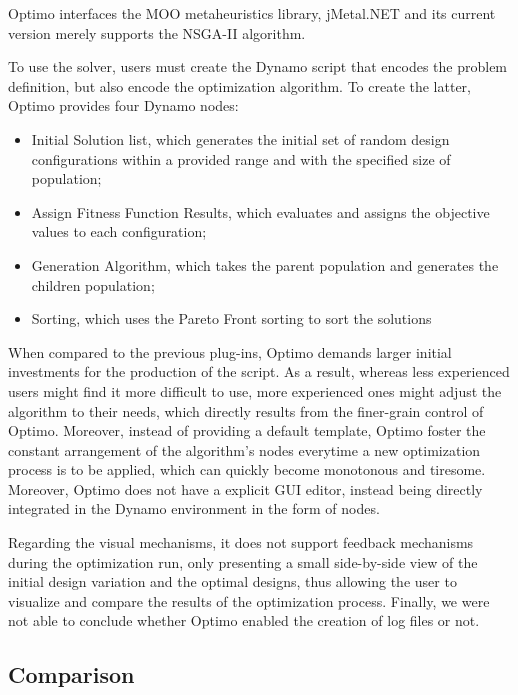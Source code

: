	Optimo interfaces the \ac{MOO} metaheuristics library, jMetal.NET and its current version merely supports the \ac{NSGA-II} algorithm\cite{Deb2002}.
	
	To use the solver, users must create the Dynamo script that encodes the problem definition, but also encode the optimization algorithm. To create the latter, Optimo provides four Dynamo nodes:
	\begin{itemize}
		\item Initial Solution list, which generates the initial set of random design configurations within a provided range and with the specified size of population;
		\item Assign Fitness Function Results, which evaluates and assigns the objective values to each configuration; 
		\item Generation Algorithm, which takes the parent population and generates the children population;
		\item Sorting, which uses the Pareto Front sorting to sort the solutions
	\end{itemize} 
	
	When compared to the previous plug-ins, Optimo demands larger initial investments for the production of the script. As a result, whereas less experienced users might find it more difficult to use, more experienced ones might adjust the algorithm to their needs, which directly results from the finer-grain control of Optimo. Moreover, instead of providing a default template, Optimo foster the constant arrangement of the algorithm's nodes everytime a new optimization process is to be applied, which can quickly become monotonous and tiresome. Moreover, Optimo does not have a explicit \ac{GUI} editor, instead being directly integrated in the Dynamo environment in the form of nodes.
	
	Regarding the visual mechanisms, it does not support feedback mechanisms during the optimization run, only presenting a small side-by-side view of the initial design variation and the optimal designs, thus allowing the user to visualize and compare the results of the optimization process. Finally, we were not able to conclude whether Optimo enabled the creation of log files or not. 
	
	
	\subsection{Comparison}
	

